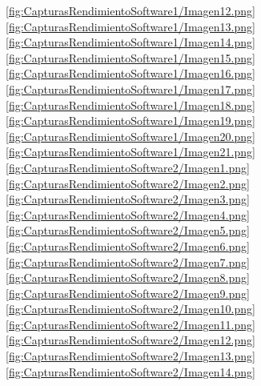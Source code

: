 \documentclass[12pt]{article}
\begin{document}
\ref{fig:CapturasRendimientoSoftware1/Imagen12.png}
\ref{fig:CapturasRendimientoSoftware1/Imagen13.png}
\ref{fig:CapturasRendimientoSoftware1/Imagen14.png}
\ref{fig:CapturasRendimientoSoftware1/Imagen15.png}
\ref{fig:CapturasRendimientoSoftware1/Imagen16.png}
\ref{fig:CapturasRendimientoSoftware1/Imagen17.png}
\ref{fig:CapturasRendimientoSoftware1/Imagen18.png}
\ref{fig:CapturasRendimientoSoftware1/Imagen19.png}
\ref{fig:CapturasRendimientoSoftware1/Imagen20.png}
\ref{fig:CapturasRendimientoSoftware1/Imagen21.png}
\ref{fig:CapturasRendimientoSoftware2/Imagen1.png}
\ref{fig:CapturasRendimientoSoftware2/Imagen2.png}
\ref{fig:CapturasRendimientoSoftware2/Imagen3.png}
\ref{fig:CapturasRendimientoSoftware2/Imagen4.png}
\ref{fig:CapturasRendimientoSoftware2/Imagen5.png}
\ref{fig:CapturasRendimientoSoftware2/Imagen6.png}
\ref{fig:CapturasRendimientoSoftware2/Imagen7.png}
\ref{fig:CapturasRendimientoSoftware2/Imagen8.png}
\ref{fig:CapturasRendimientoSoftware2/Imagen9.png}
\ref{fig:CapturasRendimientoSoftware2/Imagen10.png}
\ref{fig:CapturasRendimientoSoftware2/Imagen11.png}
\ref{fig:CapturasRendimientoSoftware2/Imagen12.png}
\ref{fig:CapturasRendimientoSoftware2/Imagen13.png}
\ref{fig:CapturasRendimientoSoftware2/Imagen14.png}
\end{document}
